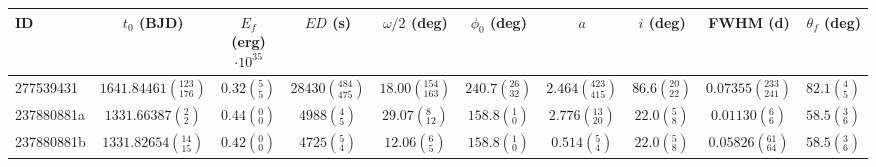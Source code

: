 \begin{tabular}{lccccccccr}
\hline\hline
         ID &                            $t_0$ (BJD) & $E_{f}$ (erg)$\cdot 10^{35}$ &                          $ED$ (s) &                  $\omega/2$ (deg) &                  $\phi_0$ (deg) &                               $a$ &                      $i$ (deg) &                            FWHM (d) &             $\theta_f$ (deg) \\
\hline
  277539431 &  $1641.84461\left(^{123}_{176}\right)$ &  $0.32\left(^{5}_{5}\right)$ &  $28430\left(^{484}_{475}\right)$ &  $18.00\left(^{154}_{163}\right)$ &  $240.7\left(^{26}_{32}\right)$ &  $2.464\left(^{423}_{415}\right)$ &  $86.6\left(^{20}_{22}\right)$ &  $0.07355\left(^{233}_{241}\right)$ &  $82.1\left(^{4}_{5}\right)$ \\
 237880881a &      $1331.66387\left(^{2}_{2}\right)$ &  $0.44\left(^{0}_{0}\right)$ &       $4988\left(^{4}_{5}\right)$ &     $29.07\left(^{8}_{12}\right)$ &    $158.8\left(^{1}_{0}\right)$ &    $2.776\left(^{13}_{20}\right)$ &    $22.0\left(^{5}_{8}\right)$ &      $0.01130\left(^{6}_{6}\right)$ &  $58.5\left(^{3}_{6}\right)$ \\
 237880881b &    $1331.82654\left(^{14}_{15}\right)$ &  $0.42\left(^{0}_{0}\right)$ &       $4725\left(^{5}_{4}\right)$ &      $12.06\left(^{6}_{5}\right)$ &    $158.8\left(^{1}_{0}\right)$ &      $0.514\left(^{5}_{4}\right)$ &    $22.0\left(^{5}_{8}\right)$ &    $0.05826\left(^{61}_{64}\right)$ &  $58.5\left(^{3}_{6}\right)$ \\
\hline

\end{tabular}

